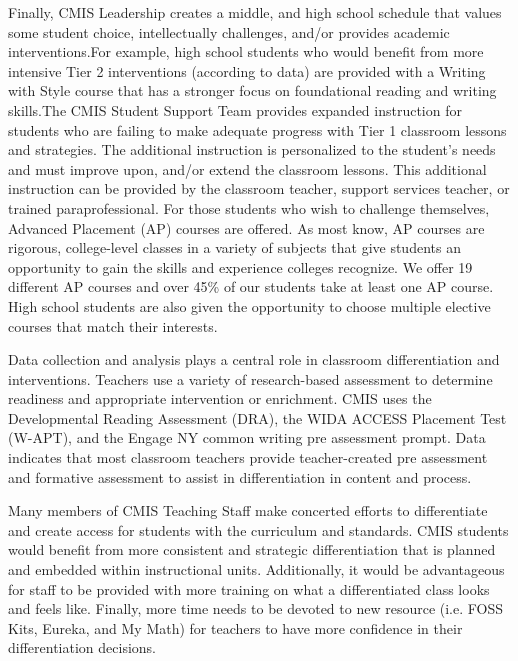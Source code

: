 \begin{findings}
Finally, CMIS Leadership creates a middle, and high school schedule that values some student choice, intellectually challenges, and/or provides academic interventions.For example, high school students who would benefit from more intensive Tier 2 interventions (according to data) are provided with a Writing with Style course that has a stronger focus on foundational reading and writing skills.The CMIS Student Support Team provides expanded instruction for students who are failing to make adequate progress with Tier 1 classroom lessons and strategies. The additional instruction is personalized to the student’s needs and must improve upon, and/or extend the classroom lessons. This additional instruction can be provided by the classroom teacher, support services teacher, or trained paraprofessional. For those students who wish to challenge themselves, Advanced Placement (AP) courses are offered. As most know, AP courses are rigorous, college-level classes in a variety of subjects that give students an opportunity to gain the skills and experience colleges recognize. We offer 19 different AP courses and over 45\% of our students take at least one AP course. High school students are also given the opportunity to choose multiple elective courses that match their interests. 

 
Data collection and analysis plays a central role in classroom differentiation and interventions. Teachers use a variety of research-based assessment to determine readiness and appropriate intervention or enrichment. CMIS uses the Developmental Reading Assessment (DRA), the WIDA ACCESS Placement Test (W-APT), and the Engage NY common writing pre assessment prompt. Data indicates that most classroom teachers provide teacher-created pre assessment and formative assessment to assist in differentiation in content and process. 


Many members of CMIS Teaching Staff make concerted efforts to differentiate and create access for students with the curriculum and standards. CMIS students would benefit from more consistent and strategic differentiation that is planned and embedded within instructional units. Additionally, it would be advantageous for staff to be provided with more training on what a differentiated class looks and feels like. Finally, more time needs to be devoted to new resource (i.e. FOSS Kits, Eureka, and My Math) for teachers to have more confidence in their differentiation decisions. 
\end{findings}

